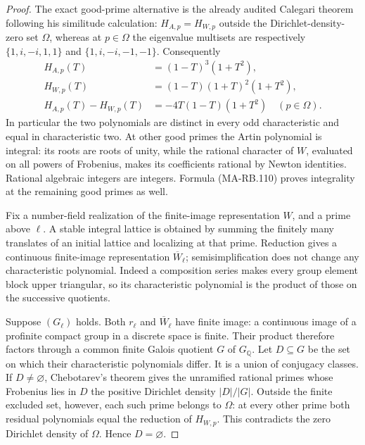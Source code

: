 \begin{proof}
The exact good-prime alternative is the already audited
Calegari theorem following his similitude calculation:
\(H_{A,p}=H_{W,p}\) outside the Dirichlet-density-zero set
\(\Omega\), whereas at \(p\in\Omega\) the eigenvalue
multisets are respectively
\(\{1,i,-i,1,1\}\) and \(\{1,i,-i,-1,-1\}\).
Consequently
\[
 \begin{aligned}
 H_{A,p}(T)&=(1-T)^3(1+T^2),\\
 H_{W,p}(T)&=(1-T)(1+T)^2(1+T^2),\\
 H_{A,p}(T)-H_{W,p}(T)&=-4T(1-T)(1+T^2)
                         \quad(p\in\Omega).
 \end{aligned}
 \tag{MA-RB.110}
\]
In particular the two polynomials are distinct in every odd
characteristic and equal in characteristic two.
At other good primes the Artin polynomial is integral: its
roots are roots of unity, while the rational character of
\(W\), evaluated on all powers of Frobenius, makes its
coefficients rational by Newton identities.  Rational
algebraic integers are integers.  Formula (MA-RB.110) proves
integrality at the remaining good primes as well.

Fix a number-field realization of the finite-image
representation \(W\), and a prime above \(\ell\).
A stable integral lattice is obtained by summing the finitely
many translates of an initial lattice and localizing at that
prime.  Reduction gives a continuous finite-image
representation \(\overline W_\ell\); semisimplification does
not change any characteristic polynomial.  Indeed a
composition series makes every group element block upper
triangular, so its characteristic polynomial is the product
of those on the successive quotients.

Suppose \((G_\ell)\) holds.  Both \(r_\ell\) and
\(\overline W_\ell\) have finite image: a continuous image
of a profinite compact group in a discrete space is finite.
Their product therefore factors through a common finite
Galois quotient \(G\) of \(G_{\mathbb Q}\).
Let \(D\subseteq G\) be the set on which their
characteristic polynomials differ.  It is a union of
conjugacy classes.  If \(D\ne\varnothing\), Chebotarev's
theorem gives the unramified rational primes whose Frobenius
lies in \(D\) the positive Dirichlet density
\(\lvert D\rvert/\lvert G\rvert\).
Outside the finite excluded set, however, each such prime
belongs to \(\Omega\): at every other prime both residual
polynomials equal the reduction of \(H_{W,p}\).
This contradicts the zero Dirichlet density of \(\Omega\).
Hence \(D=\varnothing\).


\end{proof}
